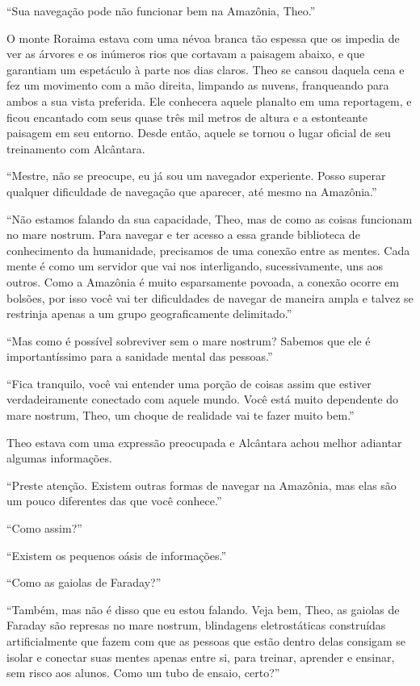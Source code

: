 \asterisc

``Sua navegação pode não funcionar bem na Amazônia, Theo.''

O monte Roraima estava com uma névoa branca tão espessa que os impedia
de ver as árvores e os inúmeros rios que cortavam a paisagem abaixo, e
que garantiam um espetáculo à parte nos dias claros. Theo se cansou
daquela cena e fez um movimento com a mão direita, limpando as nuvens,
franqueando para ambos a sua vista preferida. Ele conhecera aquele
planalto em uma reportagem, e ficou encantado com seus quase três mil
metros de altura e a estonteante paisagem em seu entorno. Desde então,
aquele se tornou o lugar oficial de seu treinamento com Alcântara.

``Mestre, não se preocupe, eu já sou um navegador experiente. Posso
superar qualquer dificuldade de navegação que aparecer, até mesmo na
Amazônia.''

``Não estamos falando da sua capacidade, Theo, mas de como as coisas
funcionam no mare nostrum. Para navegar e ter acesso a essa grande
biblioteca de conhecimento da humanidade, precisamos de uma conexão entre
as mentes. Cada mente é como um servidor que vai nos interligando,
sucessivamente, uns aos outros. Como a Amazônia é muito esparsamente
povoada, a conexão ocorre em bolsões, por isso você vai ter dificuldades
de navegar de maneira ampla e talvez se restrinja apenas a um grupo
geograficamente delimitado.''

``Mas como é possível sobreviver sem o mare nostrum? Sabemos que ele é
importantíssimo para a sanidade mental das pessoas.''

``Fica tranquilo, você vai entender uma porção de coisas assim que
estiver verdadeiramente conectado com aquele mundo. Você está muito
dependente do mare nostrum, Theo, um choque de realidade vai te fazer
muito bem.''

Theo estava com uma expressão preocupada e Alcântara achou melhor
adiantar algumas informações.

``Preste atenção. Existem outras formas de navegar na Amazônia,
mas elas são um pouco diferentes das que você conhece.''

``Como assim?''

``Existem os pequenos oásis de informações.''

``Como as gaiolas de Faraday?''

``Também, mas não é disso que eu estou falando. Veja bem, Theo, as
gaiolas de Faraday são represas no mare nostrum, blindagens
eletrostáticas construídas artificialmente que fazem com que as pessoas
que estão dentro delas consigam se isolar e conectar suas mentes apenas
entre si, para treinar, aprender e ensinar, sem risco aos alunos. Como
um tubo de ensaio, certo?''

